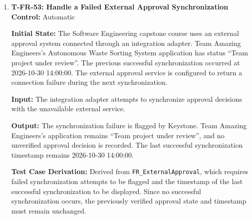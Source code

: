 \documentclass[12pt, titlepage]{article}
\begin{document}
\begin{enumerate}
\textbf{Test Case Derivation:} Derived from \texttt{FR\_ExternalApproval}, which requires \projname{} to synchronize approval decisions through an available external integration adapter. A submission identifier establishes the correspondence between the two systems, ensuring the approval is applied to the correct team-project. Successful synchronization must update the approval status and timestamp.

\textbf{How Test Will Be Performed:} Configure a controlled GitLab integration environment and associate \projname{} submission with its corresponding GitLab approval record. Using Playwright, submit the team-project through \projname{} and verify that the adapter transfers the relevant information to GitLab. Record an approval decision in GitLab and trigger synchronization. Verify that the decision updates only the corresponding \projname{} team-project to ``Approved'' and that the last successful synchronization timestamp is displayed.

\item \label{T-FR-53}\textbf{T-FR-53: Handle a Failed External Approval Synchronization}\\

\textbf{Control:} Automatic

\textbf{Initial State:} The Software Engineering capstone course uses an external approval system connected through an integration adapter. Team Amazing Engineers's Autonomous Waste Sorting System application has status ``Team project under review''. The previous successful synchronization occurred at 2026-10-30 14:00:00. The external approval service is configured to return a connection failure during the next synchronization.

\textbf{Input:} The integration adapter attempts to synchronize approval decisions with the unavailable external service.

\textbf{Output:} The synchronization failure is flagged by Keystone. Team Amazing Engineers's application remains ``Team project under review'', and no unverified approval decision is recorded. The last successful synchronization timestamp remains 2026-10-30 14:00:00.

\textbf{Test Case Derivation:} Derived from \texttt{FR\_ExternalApproval}, which requires failed synchronization attempts to be flagged and the timestamp of the last successful synchronization to be displayed. Since no successful synchronization occurs, the previously verified approval state and timestamp must remain unchanged.


\end{enumerate}
\end{document}
